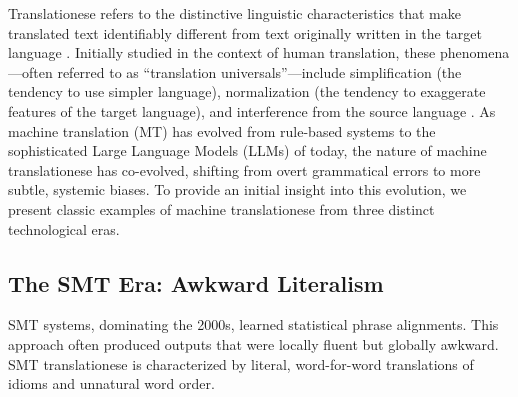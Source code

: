 \documentclass[11pt,a4paper]{article}
\begin{document}
Translationese refers to the distinctive linguistic characteristics that make translated text identifiably different from text originally written in the target language \cite{gellerstam1986translationese}. Initially studied in the context of human translation, these phenomena---often referred to as ``translation universals''---include simplification (the tendency to use simpler language), normalization (the tendency to exaggerate features of the target language), and interference from the source language \cite{baker1993corpus}. As machine translation (MT) has evolved from rule-based systems to the sophisticated Large Language Models (LLMs) of today, the nature of machine translationese has co-evolved, shifting from overt grammatical errors to more subtle, systemic biases. To provide an initial insight into this evolution, we present classic examples of machine translationese from three distinct technological eras.

\subsection{The SMT Era: Awkward Literalism}

SMT systems, dominating the 2000s, learned statistical phrase alignments. This approach often produced outputs that were locally fluent but globally awkward. SMT translationese is characterized by literal, word-for-word translations of idioms and unnatural word order.
\end{document}
